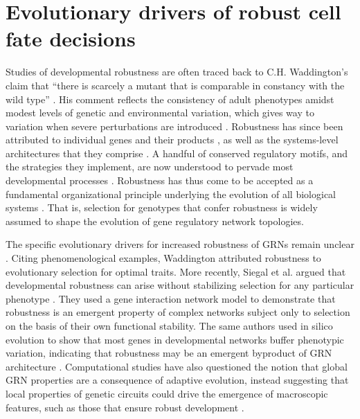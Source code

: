 \section{Evolutionary drivers of robust cell fate decisions}

Studies of developmental robustness are often traced back to C.H. Waddington’s claim that “there is scarcely a mutant that is comparable in constancy with the wild type” \cite{Waddington1942}. His comment reflects the consistency of adult phenotypes amidst modest levels of genetic and environmental variation, which gives way to variation when severe perturbations are introduced \cite{Bateman1959a,Rendel1959,Rendel1966a,Scharloo1991}. Robustness has since been attributed to individual genes and their products \cite{Dun1958,Gibson1996,Rutherford1998}, as well as the systems-level architectures that they comprise \cite{Rutherford1998,Paulsen2011,Li2009b,Eldar2002,Denby2012,Cassidy2013,Cassidy2016a}. A handful of conserved regulatory motifs, and the strategies they implement, are now understood to pervade most developmental processes \cite{Freeman2000,Hartman2001,Alon2007,Marciano2014}. Robustness has thus come to be accepted as a fundamental organizational principle underlying the evolution of all biological systems \cite{Kitano2004,Stelling2004}. That is, selection for genotypes that confer robustness is widely assumed to shape the evolution of gene regulatory network topologies. 

The specific evolutionary drivers for increased robustness of GRNs remain unclear \cite{Siegal2014}. Citing phenomenological examples, Waddington attributed robustness to evolutionary selection for optimal traits. More recently, Siegal et al. argued that developmental robustness can arise without stabilizing selection for any particular phenotype \cite{Siegal2002}. They used a gene interaction network model to demonstrate that robustness is an emergent property of complex networks subject only to selection on the basis of their own functional stability. The same authors used in silico evolution to show that most genes in developmental networks buffer phenotypic variation, indicating that robustness may be an emergent byproduct of GRN architecture \cite{Bergman2003}. Computational studies have also questioned the notion that global GRN properties are a consequence of adaptive evolution, instead suggesting that local properties of genetic circuits could drive the emergence of macroscopic features, such as those that ensure robust development \cite{Lynch2007,Wagner2003}.

